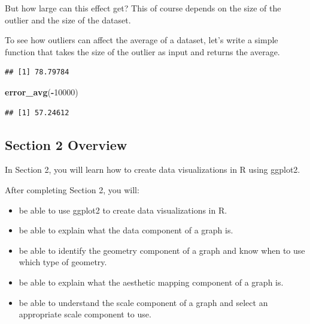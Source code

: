 \documentclass[
]{article}
\newenvironment{Shaded}{\begin{snugshade}}{\end{snugshade}}
\newcommand{\ControlFlowTok}[1]{\textcolor[rgb]{0.13,0.29,0.53}{\textbf{#1}}}
\newcommand{\DecValTok}[1]{\textcolor[rgb]{0.00,0.00,0.81}{#1}}
\newcommand{\KeywordTok}[1]{\textcolor[rgb]{0.13,0.29,0.53}{\textbf{#1}}}
\newcommand{\NormalTok}[1]{#1}
\newcommand{\OperatorTok}[1]{\textcolor[rgb]{0.81,0.36,0.00}{\textbf{#1}}}
\newcommand{\StringTok}[1]{\textcolor[rgb]{0.31,0.60,0.02}{#1}}
\providecommand{\tightlist}{%
  \setlength{\itemsep}{0pt}\setlength{\parskip}{0pt}}
\begin{document}
But how large can this effect get? This of course depends on the size of
the outlier and the size of the dataset.

To see how outliers can affect the average of a dataset, let's write a
simple function that takes the size of the outlier as input and returns
the average.

\begin{Shaded}
\end{Shaded}

\begin{verbatim}
## [1] 78.79784
\end{verbatim}

\begin{Shaded}
\begin{Highlighting}[]
\KeywordTok{error_avg}\NormalTok{(}\OperatorTok{-}\DecValTok{10000}\NormalTok{)}
\end{Highlighting}
\end{Shaded}

\begin{verbatim}
## [1] 57.24612
\end{verbatim}

\hypertarget{section-2-overview}{%
\subsection{Section 2 Overview}\label{section-2-overview}}

In Section 2, you will learn how to create data visualizations in R
using ggplot2.

After completing Section 2, you will:

\begin{itemize}
\tightlist
\item
  be able to use ggplot2 to create data visualizations in R.
\item
  be able to explain what the data component of a graph is.
\item
  be able to identify the geometry component of a graph and know when to
  use which type of geometry.
\item
  be able to explain what the aesthetic mapping component of a graph is.
\item
  be able to understand the scale component of a graph and select an
  appropriate scale component to use.
\end{itemize}
\end{document}

